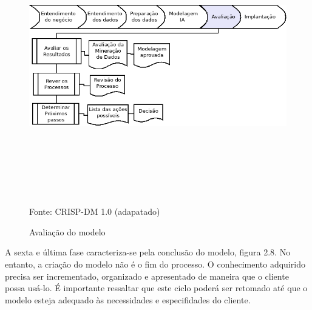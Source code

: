 \begin{figure}[!ht]
\centering
\caption{Avaliação do modelo}
\vspace{1mm}
\includegraphics[width=160mm, height=120mm]{Figuras/Cronograma/Avaliacao.png}\\
\tiny Fonte: CRISP-DM 1.0 (adapatado)
\end{figure}

\pagebreak

A sexta e última fase caracteriza-se pela conclusão do modelo, figura 2.8. No entanto, a criação do modelo não é o fim do processo.
O conhecimento adquirido precisa ser incrementado, organizado e apresentado de maneira que o cliente possa usá-lo.
É importante ressaltar que este ciclo poderá ser retomado até que o modelo esteja adequado às necessidades e especifidades do cliente.

\vspace{0.5cm}

